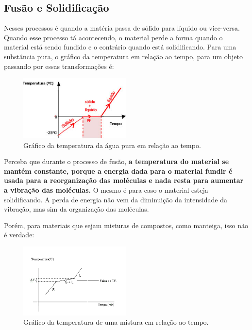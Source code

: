 \documentclass[12pt]{extarticle}
\newcommand{\<}{\langle}
\renewcommand{\>}{\rangle}
\theoremstyle{definition}
\begin{document}
\subsection{Fusão e Solidificação}

Nesses processos é quando a matéria passa de sólido para líquido ou vice-versa. Quando esse processo tá acontecendo, o material perde a forma quando o material está sendo fundido e o contrário quando está solidificando. Para uma substância pura, o gráfico da temperatura em relação ao tempo, para um objeto passando por essas transformações é:
\begin{figure}[h]
    \centering
    \includegraphics[width=0.5\textwidth]{gradico-do-ponto-de-fusao.jpg}
    \caption{Gráfico da temperatura da água pura em relação ao tempo.}
    \label{fig:solid_liquid}
\end{figure}

Perceba que durante o processo de fusão, \textbf{a temperatura do material se mantém constante, porque a energia dada para o material fundir é usada para a reorganização das moléculas e nada resta para aumentar a vibração das moléculas.} O mesmo é para caso o material esteja solidificando. A perda de energia não vem da diminuição da intensidade da vibração, mas sim da organização das moléculas.

Porém, para materiais que sejam misturas de compostos, como manteiga, isso não é verdade:

\begin{figure}[h]
    \centering
    \includegraphics[width=0.5\textwidth]{fusao_irregular.png}
    \caption{Gráfico da temperatura de uma mistura em relação ao tempo.}
    \label{fig:azeotropic}
\end{figure}
\end{document}
